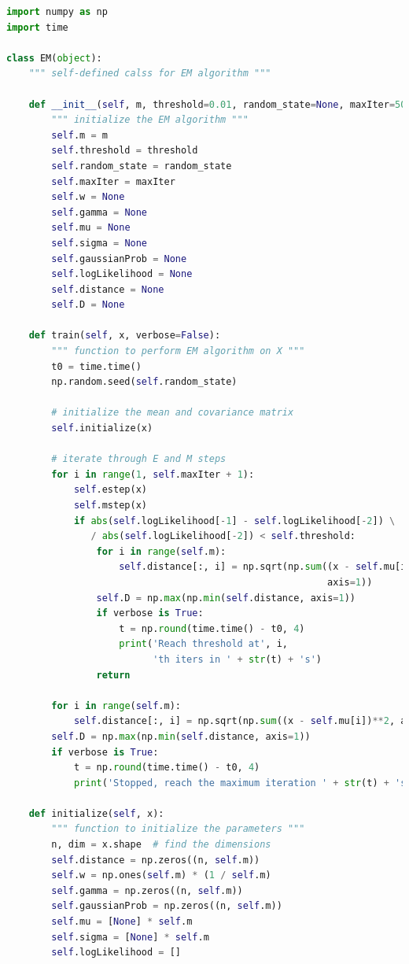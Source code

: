 \begin{lstlisting}[language=Python, caption=EM Algorithm Python Code]
import numpy as np
import time

class EM(object):
    """ self-defined calss for EM algorithm """

    def __init__(self, m, threshold=0.01, random_state=None, maxIter=500):
        """ initialize the EM algorithm """
        self.m = m
        self.threshold = threshold
        self.random_state = random_state
        self.maxIter = maxIter
        self.w = None
        self.gamma = None
        self.mu = None
        self.sigma = None
        self.gaussianProb = None
        self.logLikelihood = None
        self.distance = None
        self.D = None

    def train(self, x, verbose=False):
        """ function to perform EM algorithm on X """
        t0 = time.time()
        np.random.seed(self.random_state)

        # initialize the mean and covariance matrix
        self.initialize(x)

        # iterate through E and M steps
        for i in range(1, self.maxIter + 1):
            self.estep(x)
            self.mstep(x)
            if abs(self.logLikelihood[-1] - self.logLikelihood[-2]) \
               / abs(self.logLikelihood[-2]) < self.threshold:
                for i in range(self.m):
                    self.distance[:, i] = np.sqrt(np.sum((x - self.mu[i])**2,
                                                         axis=1))
                self.D = np.max(np.min(self.distance, axis=1))
                if verbose is True:
                    t = np.round(time.time() - t0, 4)
                    print('Reach threshold at', i,
                          'th iters in ' + str(t) + 's')
                return

        for i in range(self.m):
            self.distance[:, i] = np.sqrt(np.sum((x - self.mu[i])**2, axis=1))
        self.D = np.max(np.min(self.distance, axis=1))
        if verbose is True:
            t = np.round(time.time() - t0, 4)
            print('Stopped, reach the maximum iteration ' + str(t) + 's')

    def initialize(self, x):
        """ function to initialize the parameters """
        n, dim = x.shape  # find the dimensions
        self.distance = np.zeros((n, self.m))
        self.w = np.ones(self.m) * (1 / self.m)
        self.gamma = np.zeros((n, self.m))
        self.gaussianProb = np.zeros((n, self.m))
        self.mu = [None] * self.m
        self.sigma = [None] * self.m
        self.logLikelihood = []


\end{lstlisting}
